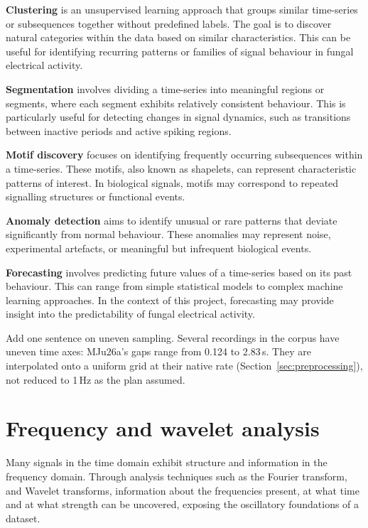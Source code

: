 \textbf{Clustering} is an unsupervised learning approach that groups similar time-series or subsequences together without predefined labels. The goal is to discover natural categories within the data based on similar characteristics. This can be useful for identifying recurring patterns or families of signal behaviour in fungal electrical activity.

\textbf{Segmentation} involves dividing a time-series into meaningful regions or segments, where each segment exhibits relatively consistent behaviour. This is particularly useful for detecting changes in signal dynamics, such as transitions between inactive periods and active spiking regions.

\textbf{Motif discovery} focuses on identifying frequently occurring subsequences within a time-series. These motifs, also known as shapelets, can represent characteristic patterns of interest. In biological signals, motifs may correspond to repeated signalling structures or functional events.

\textbf{Anomaly detection} aims to identify unusual or rare patterns that deviate significantly from normal behaviour. These anomalies may represent noise, experimental artefacts, or meaningful but infrequent biological events.

\textbf{Forecasting} involves predicting future values of a time-series based on its past behaviour. This can range from simple statistical models to complex machine learning approaches. In the context of this project, forecasting may provide insight into the predictability of fungal electrical activity.

\begin{instructions}
Add one sentence on uneven sampling. Several recordings in the corpus have uneven time axes: MJu26a's gaps range from
0.124 to 2.83\,s. They are interpolated onto a uniform grid at their native rate (Section~\ref{sec:preprocessing}),
not reduced to 1\,Hz as the plan assumed.
\end{instructions}

\section{Frequency and wavelet analysis}
\label{sec:frequency}

Many signals in the time domain exhibit structure and information in the frequency domain. Through analysis techniques such as the Fourier transform, and Wavelet transforms, information about the frequencies present, at what time and at what strength can be uncovered, exposing the oscillatory foundations of a dataset.

